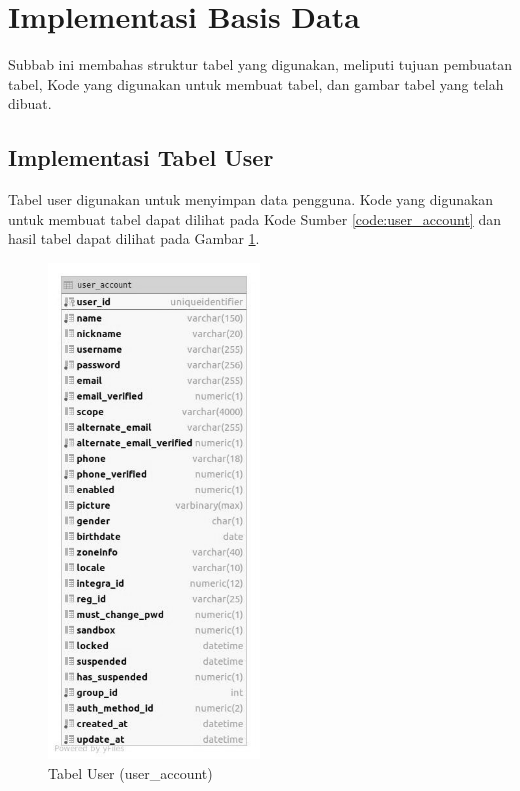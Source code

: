\section{Implementasi Basis Data}
\par Subbab ini membahas struktur tabel yang digunakan, meliputi tujuan pembuatan tabel, Kode yang digunakan untuk membuat tabel, dan gambar tabel yang telah dibuat.

\subsection{Implementasi Tabel User}
\par Tabel user digunakan untuk menyimpan data pengguna. Kode yang digunakan untuk membuat tabel dapat dilihat pada Kode Sumber \ref{code:user_account} dan hasil tabel dapat dilihat pada Gambar \ref{tabel_user_account}.

\begin{figure}[H]
    \centering\includegraphics[width=0.5\textwidth]{bab4/figures/tabel_user_account.jpg}
    \caption{Tabel User (user\_account)}
    \label{tabel_user_account}
\end{figure}

